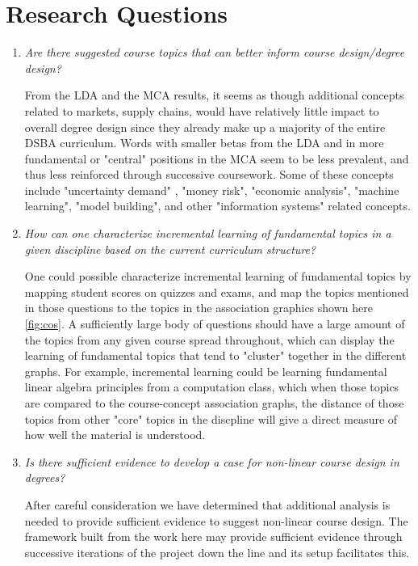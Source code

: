 \documentclass[11pt]{report}
\begin{document}
\section{Research Questions}

\begin{enumerate}

	\item \textit{Are there suggested course topics that can better inform course design/degree design?}

  \vspace{4pt}
From the LDA and the MCA results, it seems as though additional concepts related 
to markets, supply chains,  would have relatively little impact to overall degree design since they already make up a 
majority of the entire DSBA curriculum. Words with smaller betas from the LDA and in more fundamental or "central" 
positions in the MCA seem to be less prevalent, and thus less reinforced through successive coursework. Some of these 
concepts include "uncertainty demand" , "money risk", "economic analysis", "machine learning", "model building",  
and other "information systems" related concepts.

	\item \textit{How can one characterize incremental learning of fundamental topics in a given discipline based on the current curriculum structure?}
	
  \vspace{4pt}
One could possible characterize incremental learning of fundamental topics by mapping student scores on quizzes and exams,
and map the topics mentioned in those questions to the topics in the association graphics shown here \ref{fig:cos}. A 
sufficiently large body of questions should have a large amount of the topics from any given course spread throughout, which 
can display the learning of fundamental topics that tend to "cluster" together in the different graphs. For example, incremental 
learning could be learning fundamental linear algebra principles from a computation class, which when those topics are compared to the course-concept 
association graphs,  the distance of those topics from other "core" topics in the discpline will give a direct measure of how well the material is understood.

	\item \textit{Is there sufficient evidence to develop a case for non-linear course design in degrees?}
\vspace{4pt}

After careful consideration we have determined that additional analysis is needed to provide sufficient evidence to suggest 
non-linear course design. The framework built from the work here may provide sufficient evidence through successive iterations
of the project down the line and its setup facilitates this. 


\end{enumerate}
\end{document}
